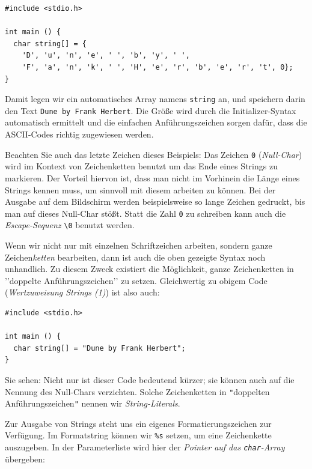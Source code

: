\begin{codebox}
\begin{verbatim}
#include <stdio.h>

int main () {
  char string[] = {
    'D', 'u', 'n', 'e', ' ', 'b', 'y', ' ', 
    'F', 'a', 'n', 'k', ' ', 'H', 'e', 'r', 'b', 'e', 'r', 't', 0};
}
\end{verbatim}
\end{codebox}

Damit legen wir ein automatisches Array namens \texttt{string} an, und speichern darin den Text \texttt{Dune by Frank Herbert}. Die Größe wird durch die Initializer-Syntax automatisch ermittelt und die einfachen Anführungszeichen sorgen dafür, dass die ASCII-Codes richtig zugewiesen werden.

Beachten Sie auch das letzte Zeichen dieses Beispiels: Das Zeichen \texttt{0} (\emph{Null-Char}) wird im Kontext von Zeichenketten benutzt um das Ende eines Strings zu markieren. Der Vorteil hiervon ist, dass man nicht im Vorhinein die Länge eines Strings kennen muss, um sinnvoll mit diesem arbeiten zu können. Bei der Ausgabe auf dem Bildschirm werden beispielsweise so lange Zeichen gedruckt, bis man auf dieses Null-Char stößt. Statt die Zahl \texttt{0} zu schreiben kann auch die \emph{Escape-Sequenz} \texttt{\textbackslash 0} benutzt werden.

Wenn wir nicht nur mit einzelnen Schriftzeichen arbeiten, sondern ganze Zeichen\emph{ketten} bearbeiten,  dann ist auch die oben gezeigte Syntax noch unhandlich. Zu diesem Zweck existiert die Möglichkeit, ganze Zeichenketten in '{}'doppelte Anführungszeichen'{}' zu setzen. Gleichwertig zu obigem Code (\emph{Wertzuweisung Strings (1)}) ist also auch:

\begin{codebox}
\begin{verbatim}
#include <stdio.h>

int main () {
  char string[] = "Dune by Frank Herbert";
}
\end{verbatim}
\end{codebox}

Sie sehen: Nicht nur ist dieser Code bedeutend kürzer; sie können auch auf die Nennung des Null-Chars verzichten. Solche Zeichenketten in \texttt{"}doppelten Anführungszeichen\texttt{"} nennen wir \emph{String-Literals}.

Zur Ausgabe von Strings steht uns ein eigenes Formatierungszeichen zur Verfügung. Im Formatstring können wir \texttt{\%s} setzen, um eine Zeichenkette auszugeben. In der Parameterliste wird hier der \emph{Pointer auf das \texttt{char}-Array} übergeben:

